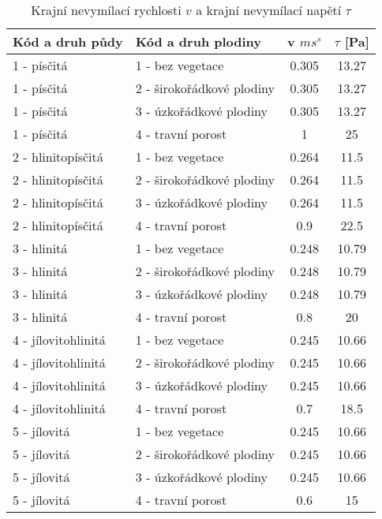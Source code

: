 \begin{table}[ht]
  \begin{tabular}{|l|l|c|c|} \hline
      \bf{Kód a druh půdy} & \bf{Kód a druh plodiny} & \bf{v $m s^{s}$} & \bf{$\tau$ [Pa]} \\ \hline 
1 - písčitá & 1 - bez vegetace & 0.305 & 13.27  \\ \hline
1 - písčitá & 2 - širokořádkové plodiny & 0.305 & 13.27 \\ \hline
1 - písčitá & 3 - úzkořádkové plodiny & 0.305 & 13.27  \\ \hline
1 - písčitá & 4 - travní porost & 1 & 25 \\ \hline
2 - hlinitopísčitá & 1 - bez vegetace & 0.264 & 11.5  \\ \hline
2 - hlinitopísčitá & 2 - širokořádkové plodiny & 0.264 & 11.5 \\ \hline
2 - hlinitopísčitá & 3 - úzkořádkové plodiny & 0.264 & 11.5  \\ \hline
2 - hlinitopísčitá & 4 - travní porost & 0.9 & 22.5 \\ \hline
3 - hlinitá & 1 - bez vegetace & 0.248 & 10.79  \\ \hline
3 - hlinitá & 2 - širokořádkové plodiny & 0.248 & 10.79 \\ \hline
3 - hlinitá & 3 - úzkořádkové plodiny & 0.248 & 10.79  \\ \hline
3 - hlinitá & 4 - travní porost & 0.8 & 20 \\ \hline \hline
4 - jílovitohlinitá & 1 - bez vegetace & 0.245 & 10.66  \\ \hline
4 - jílovitohlinitá & 2 - širokořádkové plodiny & 0.245 & 10.66 \\ \hline
4 - jílovitohlinitá & 3 - úzkořádkové plodiny & 0.245 & 10.66  \\ \hline
4 - jílovitohlinitá & 4 - travní porost & 0.7 & 18.5 \\ \hline
5 - jílovitá & 1 - bez vegetace & 0.245 & 10.66  \\ \hline
5 - jílovitá & 2 - širokořádkové plodiny & 0.245 & 10.66 \\ \hline
5 - jílovitá & 3 - úzkořádkové plodiny & 0.245 & 10.66  \\ \hline
5 - jílovitá & 4 - travní porost & 0.6 & 15 \\ \hline 
    \end{tabular}
  \caption{Krajní nevymílací rychlosti $v$ a krajní nevymílací napětí $\tau$ \cite{vrana}}
  \label{Tab. kritickehodnoty}
\end{table}